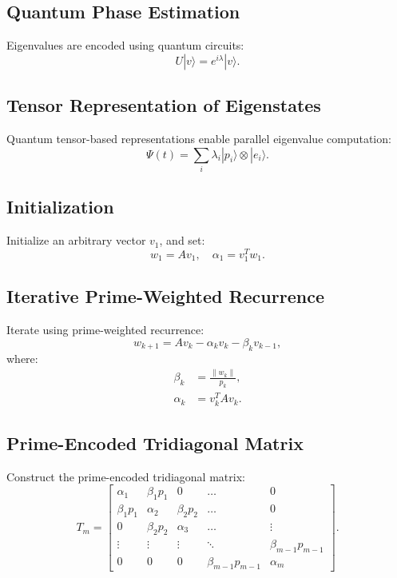 \documentclass{article}
\theoremstyle{plain}
\theoremstyle{plain}
\theoremstyle{definition}
\theoremstyle{remark}
\begin{document}
\subsection{Quantum Phase Estimation}
Eigenvalues are encoded using quantum circuits:
\begin{equation}
    U |v\rangle = e^{i \lambda} |v\rangle.
\end{equation}

\subsection{Tensor Representation of Eigenstates}
Quantum tensor-based representations enable parallel eigenvalue computation:
\begin{equation}
    \Psi(t) = \sum_{i} \lambda_i |p_i\rangle \otimes |e_i\rangle.
\end{equation}


\subsection{Initialization}
Initialize an arbitrary vector $v_1$, and set:
\begin{equation}
    w_1 = A v_1, \quad \alpha_1 = v_1^T w_1.
\end{equation}

\subsection{Iterative Prime-Weighted Recurrence}
Iterate using prime-weighted recurrence:
\begin{equation}
    w_{k+1} = A v_k - \alpha_k v_k - \beta_k v_{k-1},
\end{equation}
where:
\begin{align}
    \beta_k &= \frac{\| w_k \|}{p_k}, \\
    \alpha_k &= v_k^T A v_k.
\end{align}

\subsection{Prime-Encoded Tridiagonal Matrix}
Construct the prime-encoded tridiagonal matrix:
\begin{equation}
    T_m =
    \begin{bmatrix}
        \alpha_1 & \beta_1 p_1 & 0 & \dots & 0 \\
        \beta_1 p_1 & \alpha_2 & \beta_2 p_2 & \dots & 0 \\
        0 & \beta_2 p_2 & \alpha_3 & \dots & \vdots \\
        \vdots & \vdots & \vdots & \ddots & \beta_{m-1} p_{m-1} \\
        0 & 0 & 0 & \beta_{m-1} p_{m-1} & \alpha_m
    \end{bmatrix}.
\end{equation}
\end{document}
